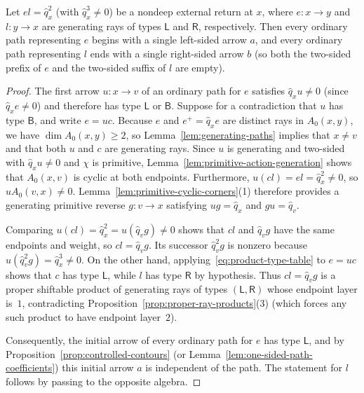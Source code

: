 \begin{lemma}
\label{lem:nondeep-boundary-arrows}
Let $el=\widehat q_x^2$ (with $\widehat q_x^3\ne0$) be a nondeep external return at $x$, where $e\colon x\to y$ and $l\colon y\to x$ are generating rays of types $\mathsf L$ and $\mathsf R$, respectively. Then every ordinary path representing $e$ begins with a single left-sided arrow $a$, and every ordinary path representing $l$ ends with a single right-sided arrow $b$ (so both the two-sided prefix of $e$ and the two-sided suffix of $l$ are empty).
\end{lemma}
\begin{proof}
The first arrow $u\colon x\to v$ of an ordinary path for $e$ satisfies $\widehat q_xu\ne0$ (since $\widehat q_xe\ne0$) and therefore has type $\mathsf L$ or $\mathsf B$. Suppose for a contradiction that $u$ has type $\mathsf B$, and write $e=uc$. Because $e$ and $e^+=\widehat q_xe$ are distinct rays in $A_0(x,y)$, we have $\dim A_0(x,y)\geq2$, so Lemma~\ref{lem:generating-paths} implies that $x\ne v$ and that both $u$ and $c$ are generating rays. Since $u$ is generating and two-sided with $\widehat q_xu\ne0$ and $\chi$ is primitive, Lemma~\ref{lem:primitive-action-generation} shows that $A_0(x,v)$ is cyclic at both endpoints. Furthermore, $u(cl)=el=\widehat q_x^2\ne0$, so $uA_0(v,x)\ne0$. Lemma~\ref{lem:primitive-cyclic-corners}(1) therefore provides a generating primitive reverse $g\colon v\to x$ satisfying $ug=\widehat q_x$ and $gu=\widehat q_v$.

Comparing $u(cl)=\widehat q_x^2=u(\widehat q_vg)\ne0$ shows that $cl$ and $\widehat q_vg$ have the same endpoints and weight, so $cl=\widehat q_vg$. Its successor $\widehat q_v^2g$ is nonzero because $u(\widehat q_v^2g)=\widehat q_x^3\ne0$. On the other hand, applying~\eqref{eq:product-type-table} to $e=uc$ shows that $c$ has type $\mathsf L$, while $l$ has type $\mathsf R$ by hypothesis. Thus $cl=\widehat q_vg$ is a proper shiftable product of generating rays of types $(\mathsf L,\mathsf R)$ whose endpoint layer is~$1$, contradicting Proposition~\ref{prop:proper-ray-products}(3) (which forces any such product to have endpoint layer~$2$).

Consequently, the initial arrow of every ordinary path for $e$ has type $\mathsf L$, and by Proposition~\ref{prop:controlled-contours} (or Lemma~\ref{lem:one-sided-path-coefficients}) this initial arrow $a$ is independent of the path. The statement for $l$ follows by passing to the opposite algebra.
\end{proof}

